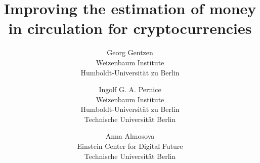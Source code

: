%
%
% 


\title{\Large \bf Improving the estimation of money in circulation for cryptocurrencies}

\author{
	{\rm Georg Gentzen}\\
	Weizenbaum Institute\\Humboldt-Universität zu Berlin
	\and
        {\rm Ingolf G. A. Pernice}\\
	Weizenbaum Institute\\Humboldt-Universität zu Berlin\\Technische Universität Berlin
	\and
	{\rm Anna Almosova}\\
	Einstein Center for Digital Future\\Technische Universität Berlin
} %

%
\def \varInputTable {}
\def \varInputFigs  {}

